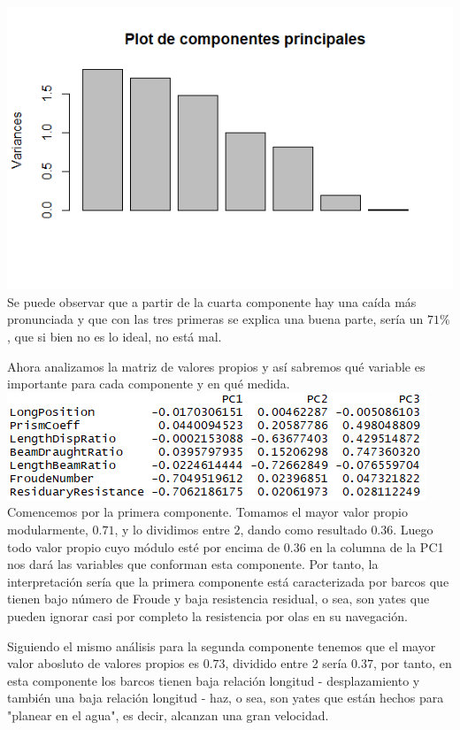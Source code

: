 \documentclass[twoside]{article}
\begin{document}
\begin{multicols}{2}
\includegraphics[scale = 0.4]{images/pic_24.png} \\

Se puede observar que a partir de la cuarta componente hay una ca\'ida m\'as pronunciada y que con las tres primeras se explica una buena parte, ser\'ia un $71\%$, que si bien no es lo ideal, no est\'a mal.

Ahora analizamos la matriz de valores propios y as\'i sabremos qu\'e variable es importante para cada componente y en qu\'e medida.\\

\includegraphics[scale = 0.5]{images/pic_25.png} \\

Comencemos por la primera componente. Tomamos el mayor valor propio modularmente, $0.71$, y lo dividimos entre $2$, dando como resultado $0.36$. Luego todo valor propio cuyo m\'odulo est\'e por encima de $0.36$ en la columna de la PC1 nos dar\'a las variables que conforman esta componente. Por tanto, la interpretaci\'on ser\'ia que la primera componente est\'a caracterizada por barcos que tienen bajo n\'umero de Froude y baja resistencia residual, o sea, son yates que pueden ignorar casi por completo la resistencia por olas en su navegaci\'on. 

Siguiendo el mismo an\'alisis para la segunda componente tenemos que el mayor valor abosluto de valores propios es $0.73$, dividido entre 2 ser\'ia $0.37$, por tanto, en esta componente los barcos tienen baja relaci\'on longitud - desplazamiento y tambi\'en una baja relaci\'on longitud - haz, o sea, son yates que est\'an hechos para "planear en el agua", es decir, alcanzan una gran velocidad. 


\end{multicols}
\end{document}
